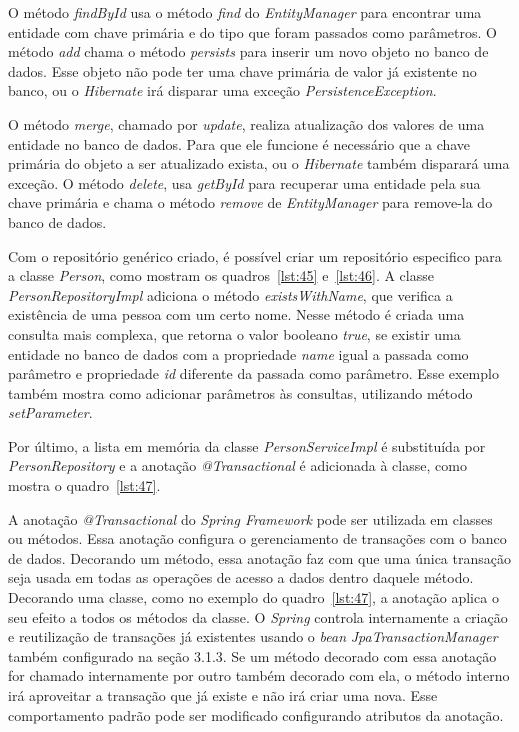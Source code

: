 \documentclass[a4paper,12pt]{article}
\newcommand{\est}[1] {
\textit{#1}}
\newcommand{\classe}[1] {
\textit{#1}}
\newcommand{\annotation}[1] {
\textit{#1}}
\newcommand{\metodo}[1] {
\textit{#1}}
\newcommand{\javacode}[3] {
	
}
\begin{document}
O método \metodo{findById} usa o método \metodo{find} do \classe{EntityManager} para encontrar uma entidade com chave primária e do tipo que foram passados como parâmetros. O método \metodo{add} chama o método \metodo{persists} para inserir um novo objeto no banco de dados. Esse objeto não pode ter uma chave primária de valor já existente no banco, ou o \est{Hibernate} irá disparar uma exceção \classe{PersistenceException}.

O método \metodo{merge}, chamado por \metodo{update}, realiza atualização dos valores de uma entidade no banco de dados. Para que ele funcione é necessário que a chave primária do objeto a ser atualizado exista, ou o \est{Hibernate} também disparará uma exceção. O método \metodo{delete}, usa \metodo{getById} para recuperar uma entidade pela sua chave primária e chama o método \metodo{remove} de \classe{EntityManager} para remove-la do banco de dados.

Com o repositório genérico criado, é possível criar um repositório especifico para a classe \classe{Person}, como mostram os quadros~\ref{lst:45} e~\ref{lst:46}. A classe \classe{PersonRepositoryImpl} adiciona o método \metodo{existsWithName}, que verifica a existência de uma pessoa com um certo nome. Nesse método é criada uma consulta mais complexa, que retorna o valor booleano \est{true}, se existir uma entidade no banco de dados com a propriedade \est{name} igual a passada como parâmetro e propriedade \est{id} diferente da passada como parâmetro. Esse exemplo também mostra como adicionar parâmetros às consultas, utilizando método \metodo{setParameter}.

\javacode{code/45.txt}{Interface PersonRepository}{lst:45}

\javacode{code/46.txt}{Classe PersonRepositoryImpl}{lst:46}

Por último, a lista em memória da classe \classe{PersonServiceImpl} é substituída por \classe{PersonRepository} e a anotação \annotation{@Transactional} é adicionada à classe, como mostra o quadro~\ref{lst:47}.

\javacode{code/47.txt}{\classe{PersonServiceImpl} utilizando \classe{PersonRepository}}{lst:47}

A anotação \annotation{@Transactional} do \est{Spring Framework} pode ser utilizada em classes ou métodos. Essa anotação configura o gerenciamento de transações com o banco de dados. Decorando um método, essa anotação faz com que uma única transação seja usada em todas as operações de acesso a dados dentro daquele método. Decorando uma classe, como no exemplo do quadro~\ref{lst:47}, a anotação aplica o seu efeito a todos os métodos da classe.  O \est{Spring} controla internamente a criação e reutilização de transações já existentes usando o \est{bean} \classe{JpaTransactionManager} também configurado na seção 3.1.3. Se um método decorado com essa anotação for chamado internamente por outro também decorado com ela, o método interno irá aproveitar a transação que já existe e não irá criar uma nova. Esse comportamento padrão pode ser modificado configurando atributos da anotação. 
\end{document}
